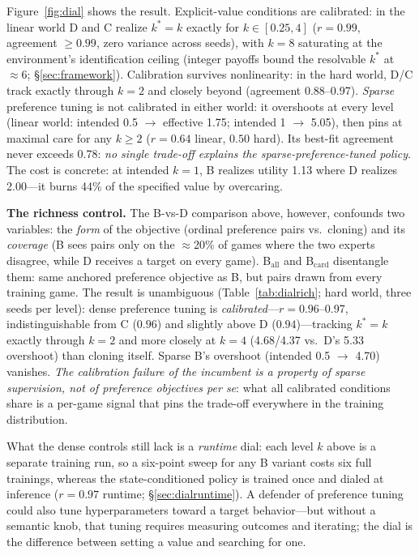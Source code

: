 \documentclass[11pt]{article}
\begin{document}
Figure~\ref{fig:dial} shows the result. Explicit-value conditions are calibrated: in the linear world D and C realize $k^* = k$ exactly for $k \in [0.25, 4]$ ($r{=}0.99$, agreement $\geq 0.99$, zero variance across seeds), with $k{=}8$ saturating at the environment's identification ceiling (integer payoffs bound the resolvable $k^*$ at ${\approx}6$; \S\ref{sec:framework}). Calibration survives nonlinearity: in the hard world, D/C track exactly through $k{=}2$ and closely beyond (agreement 0.88--0.97). \emph{Sparse} preference tuning is not calibrated in either world: it overshoots at every level (linear world: intended 0.5 $\to$ effective 1.75; intended 1 $\to$ 5.05), then pins at maximal care for any $k \geq 2$ ($r{=}0.64$ linear, $0.50$ hard). Its best-fit agreement never exceeds 0.78: \emph{no single trade-off explains the sparse-preference-tuned policy}. The cost is concrete: at intended $k{=}1$, B realizes utility 1.13 where D realizes 2.00---it burns 44\% of the specified value by overcaring.

\textbf{The richness control.} The B-vs-D comparison above, however, confounds two variables:
the \emph{form} of the objective (ordinal preference pairs vs.\ cloning) and its \emph{coverage}
(B sees pairs only on the $\approx$20\% of games where the two experts disagree, while D receives
a target on every game). B$_{\mathrm{all}}$ and B$_{\mathrm{card}}$ disentangle them: same
anchored preference objective as B, but pairs drawn from every training game. The result is
unambiguous (Table~\ref{tab:dialrich}; hard world, three seeds per level): dense preference
tuning is \emph{calibrated}---$r{=}0.96$--0.97, indistinguishable from C ($0.96$) and slightly
above D ($0.94$)---tracking $k^*{=}k$ exactly through $k{=}2$ and more closely at $k{=}4$
(4.68/4.37 vs.\ D's 5.33 overshoot) than cloning itself. Sparse B's overshoot (intended 0.5
$\to$ 4.70) vanishes. \emph{The calibration failure of the incumbent is a property of sparse
supervision, not of preference objectives per se}: what all calibrated conditions share is a
per-game signal that pins the trade-off everywhere in the training distribution.

What the dense controls still lack is a \emph{runtime} dial: each level $k$ above is a separate
training run, so a six-point sweep for any B variant costs six full trainings, whereas the
state-conditioned policy is trained once and dialed at inference ($r{=}0.97$ runtime;
\S\ref{sec:dialruntime}). A defender of preference tuning could also tune hyperparameters
toward a target behavior---but without a semantic knob, that tuning requires measuring outcomes
and iterating; the dial is the difference between setting a value and searching for one.
\end{document}
